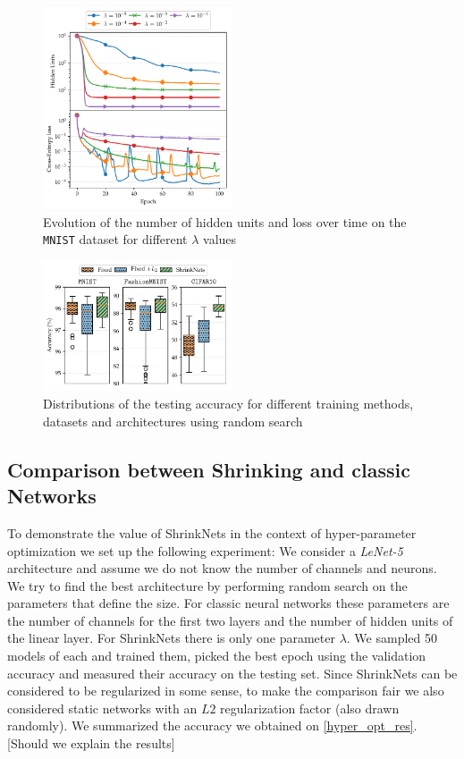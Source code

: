 \documentclass[sigconf]{acmart}
\begin{document}
\begin{figure}
\begin{center}
\includegraphics[width=0.5\textwidth]{convergence}
\caption{Evolution of the number of hidden units and loss over time on the \texttt{MNIST} dataset for different $\lambda$ values \label{convergence_plot}}
\end{center}
\end{figure}

\begin{figure}
\begin{center}
  \includegraphics[width=0.5\textwidth]{hyper_opt}
\caption{Distributions of the testing accuracy for different training methods, datasets and architectures using random search\label{hyper_opt_res}}
\end{center}
\end{figure}

\subsection{Comparison between Shrinking and classic Networks}

To demonstrate the value of ShrinkNets in the context of hyper-parameter optimization we set up the following experiment: We consider a \textit{LeNet-5} architecture and assume we do not know the number of channels and neurons. We try to find the best architecture by performing random search on the parameters that define the size. For classic neural networks these parameters are the number of channels for the first two layers and the number of hidden units of the linear layer. For ShrinkNets there is only one parameter $\lambda$. We sampled 50 models of each and trained them, picked the best epoch using the validation accuracy and measured their accuracy on the testing set. Since ShrinkNets can be considered to be regularized in some sense, to make the comparison fair we also considered static networks with an $L2$ regularization factor (also drawn randomly). We summarized the accuracy we obtained on \autoref{hyper_opt_res}. [Should we explain the results]
\end{document}

